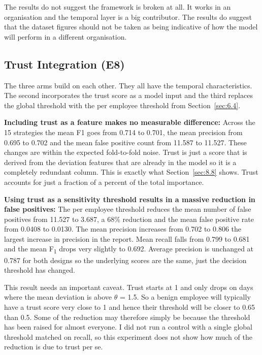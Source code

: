 \documentclass[a4paper,12pt]{article}
\newcommand{\resultinput}[1]{{\let\small\footnotesize\setlength{\tabcolsep}{4pt}}}
\begin{document}
The results do not suggest the framework is broken at all. It works in an organisation and the temporal layer is a big contributor. The results do suggest that the dataset figures should not be taken as being indicative of how the model will perform in a different organisation.

\subsection{Trust Integration (E8)}
\label{sec:8.6}

The three arms build on each other. They all have the temporal characteristics. The second incorporates the trust score as a model input and the third replaces the global threshold with the per employee threshold from Section~\ref{sec:6.4}.

\resultinput{tables/trustDesigns}

\textbf{Including trust as a feature makes no measurable difference:} Across the 15 strategies the mean F1 goes from 0.714 to 0.701, the mean precision from 0.695 to 0.702 and the mean false positive count from 11.587 to 11.527. These changes are within the expected fold-to-fold noise. Trust is just a score that is derived from the deviation features that are already in the model so it is a completely redundant column. This is exactly what Section~\ref{sec:8.8} shows. Trust accounts for just a fraction of a percent of the total importance.

\textbf{Using trust as a sensitivity threshold results in a massive reduction in false positives:} The per employee threshold reduces the mean number of false positives from 11.527 to 3.687, a 68\% reduction and the mean false positive rate from 0.0408 to 0.0130. The mean precision increases from 0.702 to 0.806 the largest increase in precision in the report. Mean recall falls from 0.799 to 0.681 and the mean F\textsubscript{1} drops very slightly to 0.692. Average precision is unchanged at 0.787 for both designs so the underlying scores are the same, just the decision threshold has changed.

This result needs an important caveat. Trust starts at 1 and only drops on days where the mean deviation is above $\theta$ = 1.5. So a benign employee will typically have a trust score very close to 1 and hence their threshold will be closer to 0.65 than 0.5. Some of the reduction may therefore simply be because the threshold has been raised for almost everyone. I did not run a control with a single global threshold matched on recall, so this experiment does not show how much of the reduction is due to trust per se.
\end{document}
